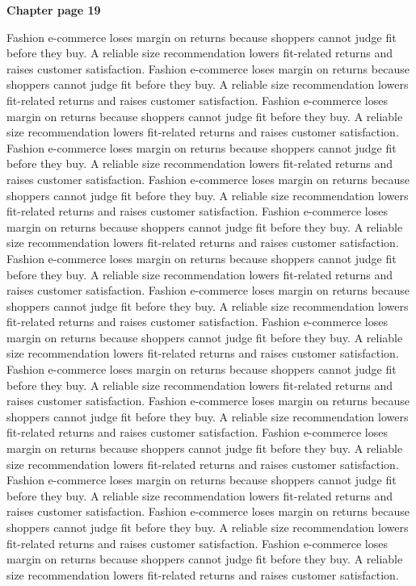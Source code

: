 \documentclass[a4paper,11pt]{article}
\begin{document}
{\headfont\bfseries\Large Chapter page 19}\par\medskip
Fashion e-commerce loses margin on returns because shoppers cannot judge fit before they buy. A reliable size recommendation lowers fit-related returns and raises customer satisfaction. Fashion e-commerce loses margin on returns because shoppers cannot judge fit before they buy. A reliable size recommendation lowers fit-related returns and raises customer satisfaction. Fashion e-commerce loses margin on returns because shoppers cannot judge fit before they buy. A reliable size recommendation lowers fit-related returns and raises customer satisfaction. Fashion e-commerce loses margin on returns because shoppers cannot judge fit before they buy. A reliable size recommendation lowers fit-related returns and raises customer satisfaction. Fashion e-commerce loses margin on returns because shoppers cannot judge fit before they buy. A reliable size recommendation lowers fit-related returns and raises customer satisfaction. 
Fashion e-commerce loses margin on returns because shoppers cannot judge fit before they buy. A reliable size recommendation lowers fit-related returns and raises customer satisfaction. Fashion e-commerce loses margin on returns because shoppers cannot judge fit before they buy. A reliable size recommendation lowers fit-related returns and raises customer satisfaction. Fashion e-commerce loses margin on returns because shoppers cannot judge fit before they buy. A reliable size recommendation lowers fit-related returns and raises customer satisfaction. Fashion e-commerce loses margin on returns because shoppers cannot judge fit before they buy. A reliable size recommendation lowers fit-related returns and raises customer satisfaction. Fashion e-commerce loses margin on returns because shoppers cannot judge fit before they buy. A reliable size recommendation lowers fit-related returns and raises customer satisfaction. 
Fashion e-commerce loses margin on returns because shoppers cannot judge fit before they buy. A reliable size recommendation lowers fit-related returns and raises customer satisfaction. Fashion e-commerce loses margin on returns because shoppers cannot judge fit before they buy. A reliable size recommendation lowers fit-related returns and raises customer satisfaction. Fashion e-commerce loses margin on returns because shoppers cannot judge fit before they buy. A reliable size recommendation lowers fit-related returns and raises customer satisfaction. Fashion e-commerce loses margin on returns because shoppers cannot judge fit before they buy. A reliable size recommendation lowers fit-related returns and raises customer satisfaction. Fashion e-commerce loses margin on returns because shoppers cannot judge fit before they buy. A reliable size recommendation lowers fit-related returns and raises customer satisfaction. \newpage
\end{document}
